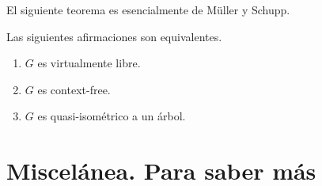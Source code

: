 \documentclass[twoside, 11pt]{article}
\begin{document}
El siguiente teorema es esencialmente de Müller y Schupp. 

\begin{teorema}
Las siguientes afirmaciones son equivalentes.
\begin{enumerate}
\item $G$ es virtualmente libre.
\item $G$ es context-free.
\item $G$ es quasi-isométrico a un árbol.
\end{enumerate}
\end{teorema}

\section{Miscelánea. Para saber más}
\end{document}
